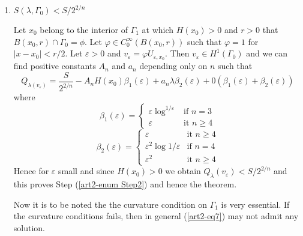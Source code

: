 \begin{sketch of the proof}
\begin{enumerate}[\rm \bf Step 1.]
\item $S(\lambda, \Gamma_{0}) < S/2^{2/n}$\label{art2-enum Step2}

Let $x_{0}$ belong to the interior of $\Gamma_{1}$ at which $H(x_{0}) > 0 $ and $r > 0$ that $B(x_{0}, r) \cap \Gamma_{0} = \phi$. Let $\varphi \in C_{0}^{\infty}(B(x_{0}, r))$ such that $\varphi = 1$ for $|x-x_{0}| < r/2$. Let $\varepsilon > 0$ and $v_{\varepsilon}  = \varphi U_{\varepsilon, x_{0}}$. Then $v_{\varepsilon} \in H^{1}(\Gamma_{0})$ and we can find positive constants $A_{n}$ and $a_{n}$ depending only on $n$ such that      
\begin{equation}
Q_{\lambda(v_{\varepsilon})} = \dfrac{S}{2^{2/n}} -A_{n}H(x_{0})\beta_{1}(\varepsilon) + a_{n}\lambda \beta_{2}(\varepsilon) + 0(\beta_{1}(\varepsilon) + \beta_{2}(\varepsilon))\label{art2-eq10}
\end{equation}
where
\begin{equation*}
\beta_{1}(\varepsilon) = 
\begin{cases}
\varepsilon \log^{1/\varepsilon} & \text{if $n =3$}\\
\varepsilon & \text{it $n\geq 4$}
\end{cases}
\end{equation*}
\begin{equation*}
\beta_{2}(\varepsilon) = 
\begin{cases}
\varepsilon & \text{it $n\geq 4$}\\
\varepsilon^{2} \log{1/\varepsilon} & \text{if $n =4$}\\
\varepsilon^{2} & \text{it $n\geq 4$}
\end{cases}
\end{equation*}
Hence for $\varepsilon$ small and since $H(x_{0}) > 0$ we obtain $Q_{\lambda}(v_{\varepsilon}) < S/2^{2/n}$ and this proves Step (\ref{art2-enum Step2}) and hence the theorem.

Now it is to be noted the the curvature condition on $\Gamma_{1}$ is very essential. If the curvature conditions fails, then in general (\ref{art2-eq7}) may not admit any solution.


\end{enumerate}
\end{sketch of the proof}
